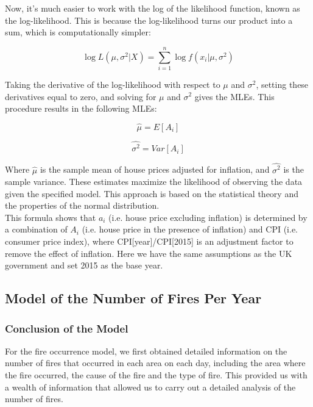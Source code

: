 \documentclass[12pt]{article}  %
\begin{document}
Now, it's much easier to work with the log of the likelihood function, known as the log-likelihood. This is because the log-likelihood turns our product into a sum, which is computationally simpler:

\begin{equation}
\log L(\mu, \sigma^2|X)=\sum_{i=1}^{n} \log f(x_i|\mu, \sigma^2)
\end{equation}

Taking the derivative of the log-likelihood with respect to $\mu$ and $\sigma^2$, setting these derivatives equal to zero, and solving for $\mu$ and $\sigma^2$ gives the MLEs. This procedure results in the following MLEs:

\begin{equation}
\hat{\mu}=E[A_i]
\end{equation}

\begin{equation}
\hat{\sigma^2}=Var[A_i]
\end{equation}

Where $\hat{\mu}$ is the sample mean of house prices adjusted for inflation, and $\hat{\sigma^2}$ is the sample variance. These estimates maximize the likelihood of observing the data given the specified model. This approach is based on the statistical theory and the properties of the normal distribution.\\
This formula shows that $a_i$ (i.e. house price excluding inflation) is determined by a combination of $A_i$ (i.e. house price in the presence of inflation) and CPI (i.e. consumer price index), where CPI[year]/CPI[2015] is an adjustment factor to remove the effect of inflation. Here we have the same assumptions as the UK government and set 2015 as the base year.
\textsuperscript{\cite{guide}} \


\subsection{Model of the Number of Fires Per Year}
\subsubsection{Conclusion of the Model}
For the fire occurrence model, we first obtained detailed information on the number of 
fires that occurred in each area on each day, including the area where the fire 
occurred, the cause of the fire and the type of fire. This provided us with a wealth 
of information that allowed us to carry out a detailed analysis of the number of fires.
\end{document}
